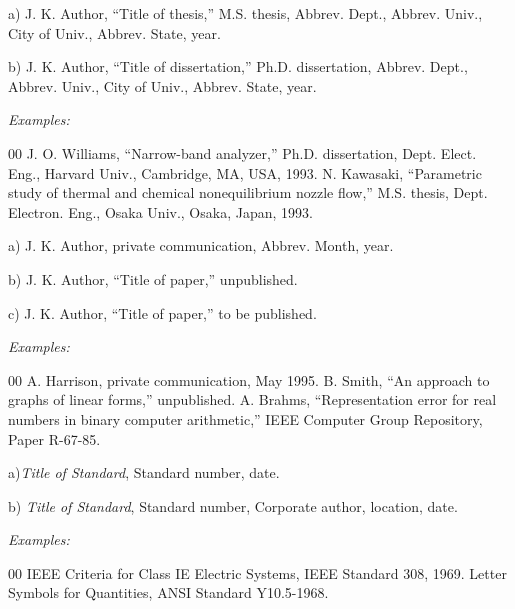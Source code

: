 \documentclass{ieeetmlcn}
\begin{document}
\noindent a) J. K. Author, ``Title of thesis,'' M.S. thesis, Abbrev. Dept., Abbrev.
Univ., City of Univ., Abbrev. State, year.

\noindent b) J. K. Author, ``Title of dissertation,'' Ph.D. dissertation, Abbrev.
Dept., Abbrev. Univ., City of Univ., Abbrev. State, year.

{\it Examples:}

\begin{thebibliography}{00}
 J. O. Williams, ``Narrow-band analyzer,'' Ph.D. dissertation, Dept. Elect. Eng., Harvard Univ., Cambridge, MA, USA, 1993.
 N. Kawasaki, ``Parametric study of thermal and chemical nonequilibrium nozzle flow,'' M.S. thesis, Dept. Electron. Eng., Osaka Univ., Osaka, Japan, 1993.
\end{thebibliography}


\noindent a) J. K. Author, private communication, Abbrev. Month, year.

\noindent b) J. K. Author, ``Title of paper,'' unpublished.

\noindent c) J. K. Author, ``Title of paper,'' to be published.

\eject

{\it Examples:}

\begin{thebibliography}{00}
 A. Harrison, private communication, May 1995.
 B. Smith, ``An approach to graphs of linear forms,'' unpublished.
 A. Brahms, ``Representation error for real numbers in binary computer arithmetic,'' IEEE Computer Group Repository, Paper R-67-85.
\end{thebibliography}


\noindent a){\it Title of Standard}, Standard number, date.

\noindent b) {\it Title of Standard}, Standard number, Corporate author, location, date.

{\it Examples:}

\begin{thebibliography}{00}
 IEEE Criteria for Class IE Electric Systems, IEEE Standard 308, 1969.
 Letter Symbols for Quantities, ANSI Standard Y10.5-1968.
\end{thebibliography}
\end{document}
